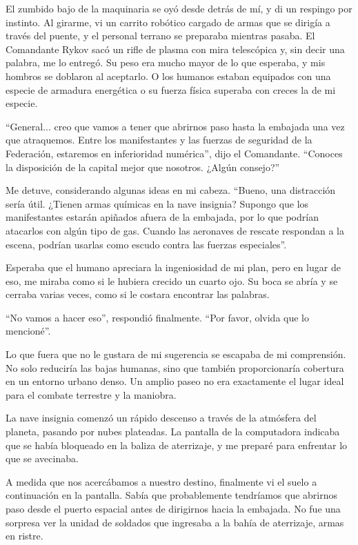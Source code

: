 \documentclass[spanish,12pt,a4paper,oneside,titlepage]{book}
\begin{document}
    El zumbido bajo de la maquinaria se oyó desde detrás de mí, y di un respingo por instinto. Al girarme, vi un carrito robótico cargado de armas que se dirigía a través del puente, y el personal terrano se preparaba mientras pasaba. El Comandante Rykov sacó un rifle de plasma con mira telescópica y, sin decir una palabra, me lo entregó. Su peso era mucho mayor de lo que esperaba, y mis hombros se doblaron al aceptarlo. O los humanos estaban equipados con una especie de armadura energética o su fuerza física superaba con creces la de mi especie.

    ``General... creo que vamos a tener que abrirnos paso hasta la embajada una vez que atraquemos. Entre los manifestantes y las fuerzas de seguridad de la Federación, estaremos en inferioridad numérica'', dijo el Comandante. ``Conoces la disposición de la capital mejor que nosotros. ¿Algún consejo?''

    Me detuve, considerando algunas ideas en mi cabeza. ``Bueno, una distracción sería útil. ¿Tienen armas químicas en la nave insignia? Supongo que los manifestantes estarán apiñados afuera de la embajada, por lo que podrían atacarlos con algún tipo de gas. Cuando las aeronaves de rescate respondan a la escena, podrían usarlas como escudo contra las fuerzas especiales''.

    Esperaba que el humano apreciara la ingeniosidad de mi plan, pero en lugar de eso, me miraba como si le hubiera crecido un cuarto ojo. Su boca se abría y se cerraba varias veces, como si le costara encontrar las palabras.

    ``No vamos a hacer eso'', respondió finalmente. ``Por favor, olvida que lo mencioné''.

    Lo que fuera que no le gustara de mi sugerencia se escapaba de mi comprensión. No solo reduciría las bajas humanas, sino que también proporcionaría cobertura en un entorno urbano denso. Un amplio paseo no era exactamente el lugar ideal para el combate terrestre y la maniobra.

    La nave insignia comenzó un rápido descenso a través de la atmósfera del planeta, pasando por nubes plateadas. La pantalla de la computadora indicaba que se había bloqueado en la baliza de aterrizaje, y me preparé para enfrentar lo que se avecinaba.

    A medida que nos acercábamos a nuestro destino, finalmente vi el suelo a continuación en la pantalla. Sabía que probablemente tendríamos que abrirnos paso desde el puerto espacial antes de dirigirnos hacia la embajada. No fue una sorpresa ver la unidad de soldados que ingresaba a la bahía de aterrizaje, armas en ristre.
\end{document}
